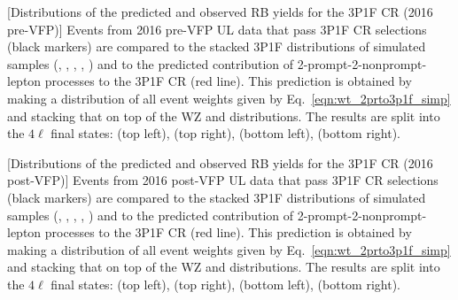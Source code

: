 \begin{multiFigure}
	\centering
		[Distributions of the predicted and observed RB yields for the 3P1F CR (2016 pre-VFP)]
		{Events from 2016 pre-VFP UL data that pass 3P1F CR selections (black markers) 
		are compared to the stacked 3P1F distributions of simulated samples
		(\Zplusjets, \ttbarplusjets, \WZ, \ZZ, \Zgammastar)
		and to the predicted contribution of 2-prompt-2-nonprompt-lepton processes to the 3P1F CR (red line).
		This prediction is obtained by making a distribution of all event weights given by Eq.~\ref{eqn:wt_2prto3p1f_simp} and stacking that on top of the WZ and \ZZ distributions.
		The results are split into the $4\ell$ final states:
		\fourmu (top left), \foure (top right), \twoetwomu (bottom left), \twomutwoe (bottom right).}
	\label{cr_plots_3p1f_2016prevfp}
\end{multiFigure}
\begin{multiFigure}
	\centering
		[Distributions of the predicted and observed RB yields for the 3P1F CR (2016 post-VFP)]
		{Events from 2016 post-VFP UL data that pass 3P1F CR selections (black markers) 
		are compared to the stacked 3P1F distributions of simulated samples
		(\Zplusjets, \ttbarplusjets, \WZ, \ZZ, \Zgammastar)
		and to the predicted contribution of 2-prompt-2-nonprompt-lepton processes to the 3P1F CR (red line).
		This prediction is obtained by making a distribution of all event weights given by Eq.~\ref{eqn:wt_2prto3p1f_simp} and stacking that on top of the WZ and \ZZ distributions.
		The results are split into the $4\ell$ final states:
		\fourmu (top left), \foure (top right), \twoetwomu (bottom left), \twomutwoe (bottom right).}
	\label{cr_plots_3p1f_2016postvfp}
\end{multiFigure}
